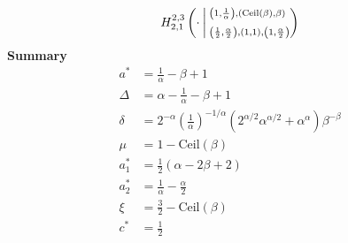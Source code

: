 \documentclass{article}
\newcommand{\FoxH}[5]{H_{#2}^{#1}\left(#3\:\middle\vert\: \begin{subarray}{l}#4\\[0.4em] #5\end{subarray}\right)}
\begin{document}
\begin{align*}
\FoxH{2,3}{2,1}{\cdot}{\left(1, \frac{1}{\alpha }\right), \left(\text{Ceil}(\beta ), \beta\right)}{\left(\frac{1}{2}, \frac{\alpha }{2}\right), \left(1, 1\right), \left(1, \frac{\alpha }{2}\right)}
\end{align*}
\noindent\textbf{Summary}
\begin{align*}
a^* &= \frac{1}{\alpha }-\beta +1 \\
\Delta &= \alpha -\frac{1}{\alpha }-\beta +1 \\
\delta &= 2^{-\alpha } \left(\frac{1}{\alpha }\right)^{-1/\alpha } \left(2^{\alpha /2} \alpha ^{\alpha /2}+\alpha ^{\alpha }\right) \beta ^{-\beta } \\
\mu &= 1-\text{Ceil}(\beta ) \\
a_1^* &= \frac{1}{2} (\alpha -2 \beta +2) \\
a_2^* &= \frac{1}{\alpha }-\frac{\alpha }{2} \\
\xi &= \frac{3}{2}-\text{Ceil}(\beta ) \\
c^* &= \frac{1}{2} \\
\end{align*}
\end{document}
